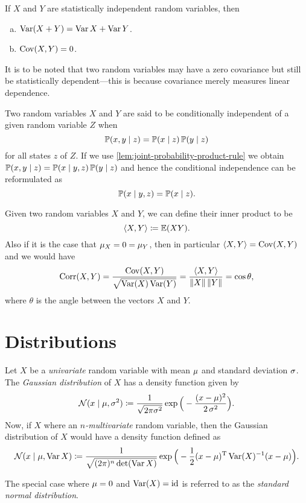 \begin{lemma}
\label{lem:statistical-independence-and-cov-var}
If \(X\) and \(Y\) are statistically independent random variables, then
\begin{enumerate}[(a)]\setlength\itemsep{0em}
\item \(\operatorname{Var}(X + Y) = \operatorname{Var} X + \operatorname{Var} Y\).
\item \(\operatorname{Cov}(X, Y) = 0\).
\end{enumerate}
It is to be noted that two random variables may have a zero covariance but
still be statistically dependent---this is because covariance merely measures
linear dependence.
\end{lemma}

\begin{definition}
\label{def:conditional-independence}
Two random variables \(X\) and \(Y\) are said to be conditionally independent of
a given random variable \(Z\) when
\[
\operatorname{\mathbb{P}}(x, y \mid z) = \operatorname{\mathbb{P}}(x \mid z) \operatorname{\mathbb{P}}(y \mid z)
\]
for all states \(z\) of \(Z\). If we use
\cref{lem:joint-probability-product-rule} we obtain \(\operatorname{\mathbb{P}}(x, y \mid z) =
\operatorname{\mathbb{P}}(x \mid y, z) \operatorname{\mathbb{P}}(y \mid z)\) and hence the conditional independence can
be reformulated as
\[
\operatorname{\mathbb{P}}(x \mid y, z) = \operatorname{\mathbb{P}}(x \mid z).
\]
\end{definition}

\begin{definition}
\label{def:inner-product-random-variables}
Given two random variables \(X\) and \(Y\), we can define their inner product to
be
\[
\langle X, Y \rangle \coloneq \operatorname{\mathbb{E}}(X Y).
\]
Also if it is the case that \(\mu_X = 0 = \mu_Y\), then in particular
\(\langle X, Y \rangle = \operatorname{Cov}(X, Y)\) and we would have
\[
\operatorname{Corr}(X, Y) = \frac{\operatorname{Cov}(X, Y)}{\sqrt{\operatorname{Var}(X) \operatorname{Var}(Y)}}
= \frac{\langle X, Y \rangle}{\| X \|\, \| Y \|} = \cos \theta,
\]
where \(\theta\) is the angle between the vectors \(X\) and \(Y\).
\end{definition}

\section{Distributions}

\begin{definition}
\label{def:gaussian-distribution}
Let \(X\) be a \emph{univariate} random variable with mean \(\mu\) and
standard deviation \(\operatorname{\sigma}\). The \emph{Gaussian distribution} of \(X\) has a
density function given by
\[
\operatorname{\mathcal{N}}(x \mid \mu, \operatorname{\sigma}^2) \coloneq \frac{1}{\sqrt{2 \pi \sigma^{2}}}
\exp\Big( -\frac{(x - \mu)^2}{2 \operatorname{\sigma}^2} \Big).
\]
Now, if \(X\) where an \emph{\(n\)-multivariate} random variable, then the Gaussian
distribution of \(X\) would have a density function defined as
\[
\operatorname{\mathcal{N}}(x \mid \mu, \operatorname{Var} X) \coloneq \frac{1}{\sqrt{(2 \pi)^n \det(\operatorname{Var} X)}}
\exp\Big(-\frac{1}{2} (x - \mu)^{\operatorname{T}} \operatorname{Var}(X)^{-1} (x - \mu)\Big).
\]

The special case where \(\mu = 0\) and \(\operatorname{Var}(X) = \operatorname{id}\) is referred to as the
\emph{standard normal distribution}.
\end{definition}

